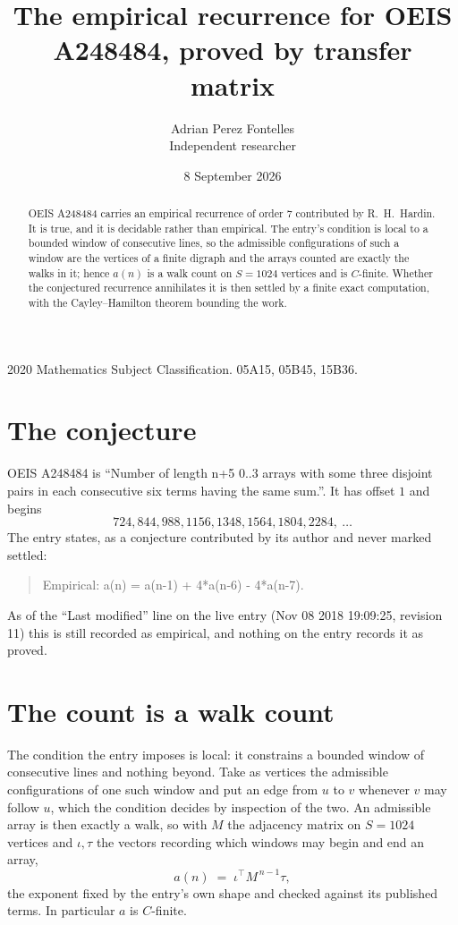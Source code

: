 \documentclass[11pt,a4paper]{article}
\title{The empirical recurrence for OEIS A248484, proved by transfer matrix}
\author{Adrian Perez Fontelles\\ \small Independent researcher}
\date{8 September 2026}
\theoremstyle{plain}
\theoremstyle{definition}
\begin{document}
\maketitle

\begin{abstract}
OEIS A248484 carries an empirical recurrence of order $7$ contributed by R.~H.~Hardin. It is
true, and it is decidable rather than empirical. The entry's condition is local to a bounded window of consecutive lines, so
the admissible configurations of such a window are the vertices of a finite digraph and the
arrays counted are exactly the walks in it; hence $a(n)$ is a walk count on $S=1024$ vertices
and is $C$-finite. Whether the conjectured recurrence annihilates it is then settled by a
finite exact computation, with the Cayley--Hamilton theorem bounding the work.
\end{abstract}

\noindent\small 2020 Mathematics Subject Classification. 05A15, 05B45, 15B36.\normalsize

\section{The conjecture}

OEIS A248484 is ``Number of length n+5 0..3 arrays with some three disjoint pairs in each consecutive six terms having the same sum.''. It has offset $1$ and begins
\[
724, 844, 988, 1156, 1348, 1564, 1804, 2284,\ \dots
\]
The entry states, as a conjecture contributed by its author and never marked settled:
\begin{quote}
Empirical: a(n) = a(n-1) + 4*a(n-6) - 4*a(n-7).
\end{quote}
As of the ``Last modified'' line on the live entry (Nov 08 2018 19:09:25, revision 11) this is still
recorded as empirical, and nothing on the entry records it as proved.

\section{The count is a walk count}

The condition the entry imposes is local: it constrains a bounded window of consecutive lines and nothing beyond. Take as
vertices the admissible configurations of one such window and put an edge from $u$ to $v$
whenever $v$ may follow $u$, which the condition decides by inspection of the two. An
admissible array is then exactly a walk, so with $M$ the adjacency matrix on $S=1024$ vertices
and $\iota,\tau$ the vectors recording which windows may begin and end an array,
\[
a(n)\;=\;\iota^{\!\top}M^{\,n-1}\tau ,
\]
the exponent fixed by the entry's own shape and checked against its published terms. In
particular $a$ is $C$-finite.
\end{document}
